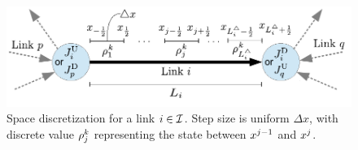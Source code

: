 
\begin{figure}
\begin{centering}
\includegraphics[width=0.6\columnwidth]{figs-gen/dx}
\par\end{centering}

\caption{Space discretization for a link $i\in\mathcal{I}$. Step size is uniform
$\Delta x$, with discrete value $\rho_{j}^{k}$ representing
the state between $x^{j-1}$ and $x^{j}$.\label{fig:Space-discretization-for}}


\end{figure}

